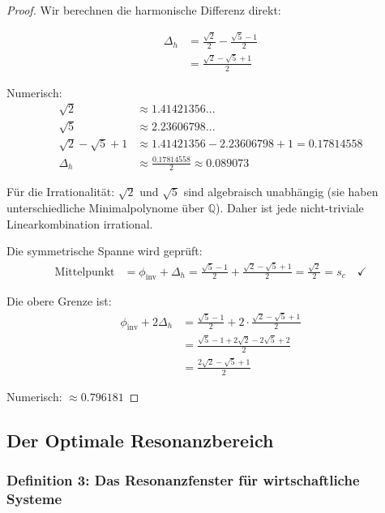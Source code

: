 \documentclass[a4paper,12pt,twoside]{report}
\theoremstyle{definition}
\begin{document}
\begin{proof}

Wir berechnen die harmonische Differenz direkt:

\begin{align}
\Delta_h &= \frac{\sqrt{2}}{2} - \frac{\sqrt{5}-1}{2} \\
&= \frac{\sqrt{2} - \sqrt{5} + 1}{2}
\end{align}

Numerisch:
\begin{align}
\sqrt{2} &\approx 1.41421356... \\
\sqrt{5} &\approx 2.23606798... \\
\sqrt{2} - \sqrt{5} + 1 &\approx 1.41421356 - 2.23606798 + 1 = 0.17814558 \\
\Delta_h &\approx \frac{0.17814558}{2} \approx 0.089073
\end{align}

Für die Irrationalität: $\sqrt{2}$ und $\sqrt{5}$ sind algebraisch unabhängig (sie haben unterschiedliche Minimalpolynome über $\mathbb{Q}$). Daher ist jede nicht-triviale Linearkombination irrational.

Die symmetrische Spanne wird geprüft:
\begin{align}
\text{Mittelpunkt} &= \phi_{\text{inv}} + \Delta_h = \frac{\sqrt{5}-1}{2} + \frac{\sqrt{2}-\sqrt{5}+1}{2} = \frac{\sqrt{2}}{2} = s_c \quad \checkmark
\end{align}

Die obere Grenze ist:
\begin{align}
\phi_{\text{inv}} + 2\Delta_h &= \frac{\sqrt{5}-1}{2} + 2 \cdot \frac{\sqrt{2}-\sqrt{5}+1}{2} \\
&= \frac{\sqrt{5}-1 + 2\sqrt{2} - 2\sqrt{5} + 2}{2} \\
&= \frac{2\sqrt{2} - \sqrt{5} + 1}{2}
\end{align}

Numerisch: $\approx 0.796181$

\end{proof}

\subsection{Der Optimale Resonanzbereich}

\subsubsection{Definition 3: Das Resonanzfenster für wirtschaftliche Systeme}
\end{document}
